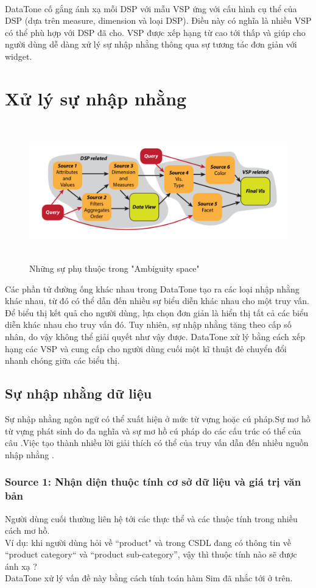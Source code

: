 \documentclass[12pt]{report}
\begin{document}
\paragraph*{}
DataTone cố gắng ánh xạ mỗi DSP với mẫu VSP ứng với cấu hình cụ thể của DSP (dựa trên measure, dimension và loại DSP). Điều này có nghĩa là nhiều VSP có thể phù hợp với DSP đã cho. VSP được xếp hạng từ cao tới thấp và giúp cho người dùng dễ dàng xử lý sự nhập nhằng thông qua sự tương tác đơn giản với widget.
\section{Xử lý sự nhập nhằng}
\begin{figure}[h!]
	\centering
	\includegraphics[width=15cm, height=6cm]{Ambiguity.png}
	\caption{Những sự phụ thuộc trong "Ambiguity space"}
\end{figure}

Các phần tử đường ống khác nhau trong DataTone tạo ra các loại nhập nhằng khác nhau, từ đó có thể dẫn đến nhiều sự biểu diễn khác nhau cho một truy vấn. Để biểu thị kết quả cho người dùng, lựa chọn đơn giản là hiển thị tất cả các biểu diễn khác nhau cho truy vấn đó. Tuy nhiên, sự nhập nhằng tăng theo cấp số nhân, do vậy không thể giải quyết như vậy được. DataTone xử lý bằng cách xếp hạng các VSP và cung cấp cho người dùng cuối  một kĩ thuật đẻ chuyển đổi nhanh chóng giữa các biểu thị.

\subsection{Sự nhập nhằng dữ liệu}
Sự nhập nhằng ngôn ngữ có thể xuất hiện ở mức từ vựng hoặc cú pháp.Sự mơ hồ từ vựng phát sinh do đa nghĩa và sự mơ hồ cú pháp do các cấu trúc có thể của câu .Việc tạo thành nhiều lời giải thích có thể của truy vấn dẫn đến nhiều nguồn nhập nhằng .
\subsubsection*{Source 1: Nhận diện thuộc tính cơ sở dữ liệu và giá trị văn bản} 
Người dùng cuối thường liên hệ tới các thực thể và các thuộc tính trong nhiều cách mơ hồ.
\\
Ví dụ: khi người dùng hỏi về “product" và trong CSDL đang có thông tin về “product category“ và “product sub-category”, vậy thì thuộc tính nào sẽ được ánh xạ ?
\\
DataTone xử lý vấn đề này bằng cách tính toán hàm Sim đã nhắc tới ở trên.
\end{document}
